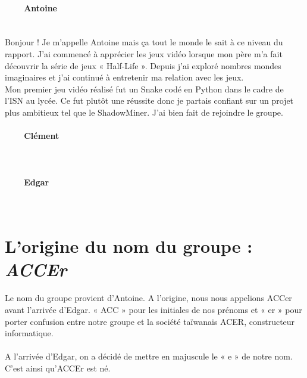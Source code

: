 \documentclass[titlepage, 13px, a4paper]{report}
\begin{document}
\paragraph{~~~~Antoine} \hspace{0pt} \\
Bonjour ! Je m'appelle Antoine mais ça tout le monde le sait à ce niveau du rapport.  
J'ai commencé à apprécier les jeux vidéo lorsque mon père m'a fait découvrir la série de 
jeux « Half-Life ». Depuis j'ai exploré nombres mondes imaginaires et j'ai continué à 
entretenir ma relation avec les jeux. \\
Mon premier jeu vidéo réalisé fut un Snake codé 
en Python dans le cadre de l'ISN au lycée. Ce fut plutôt une réussite donc je partais 
confiant sur un projet plus ambitieux tel que le ShadowMiner. J'ai bien fait de rejoindre le groupe. \\


\paragraph{~~~~Clément} \hspace{0pt} \\


\paragraph{~~~~Edgar} \hspace{0pt} \\



\section{L'origine du nom du groupe : \textit{ACCEr}}
\paragraph{} \hspace{0pt}
Le nom du groupe provient d’Antoine. A l’origine, nous nous appelions ACCer avant l’arrivée d’Edgar. 
« ACC » pour les initiales de nos prénoms et « er » pour porter confusion entre notre groupe 
et la société taïwanais ACER, constructeur informatique. \\ \\
A l’arrivée d’Edgar, on a décidé de mettre en majuscule le « e » de notre nom. \\
C’est ainsi qu’ACCEr est né.
\end{document}
